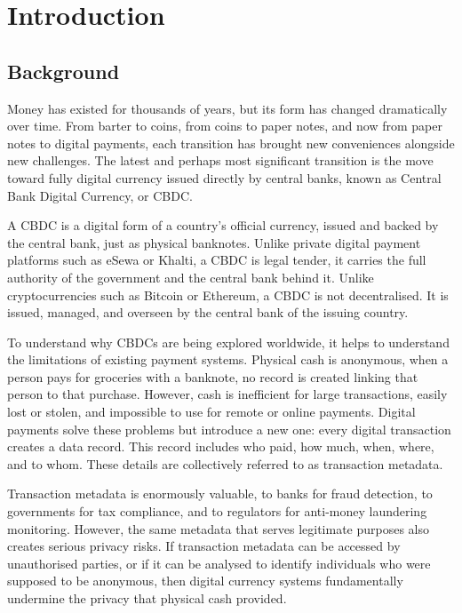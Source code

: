 
\chapter{Introduction}
\label{ch:introduction}

\section{Background}
\label{sec:background}

Money has existed for thousands of years, but its form has
changed dramatically over time. From barter to coins, from
coins to paper notes, and now from paper notes to digital
payments, each transition has brought new conveniences
alongside new challenges. The latest and perhaps most
significant transition is the move toward fully digital
currency issued directly by central banks, known as Central
Bank Digital Currency, or CBDC.

A CBDC is a digital form of a country's official currency,
issued and backed by the central bank, just as physical
banknotes. Unlike private digital payment platforms such
as eSewa or Khalti, a CBDC is legal tender, it carries the
full authority of the government and the central bank behind
it. Unlike cryptocurrencies such as Bitcoin or Ethereum, a
CBDC is not decentralised. It is issued, managed, and
overseen by the central bank of the issuing country.

To understand why CBDCs are being explored worldwide, it helps
to understand the limitations of existing payment systems.
Physical cash is anonymous, when a person pays for groceries
with a banknote, no record is created linking that person to
that purchase. However, cash is inefficient for large
transactions, easily lost or stolen, and impossible to use
for remote or online payments. Digital payments solve these
problems but introduce a new one: every digital transaction
creates a data record. This record includes who paid, how
much, when, where, and to whom. These details are collectively
referred to as transaction metadata.

Transaction metadata is enormously valuable, to banks for
fraud detection, to governments for tax compliance, and to
regulators for anti-money laundering monitoring. However, the
same metadata that serves legitimate purposes also creates
serious privacy risks. If transaction metadata can be accessed
by unauthorised parties, or if it can be analysed to identify
individuals who were supposed to be anonymous, then digital
currency systems fundamentally undermine the privacy that
physical cash provided.

